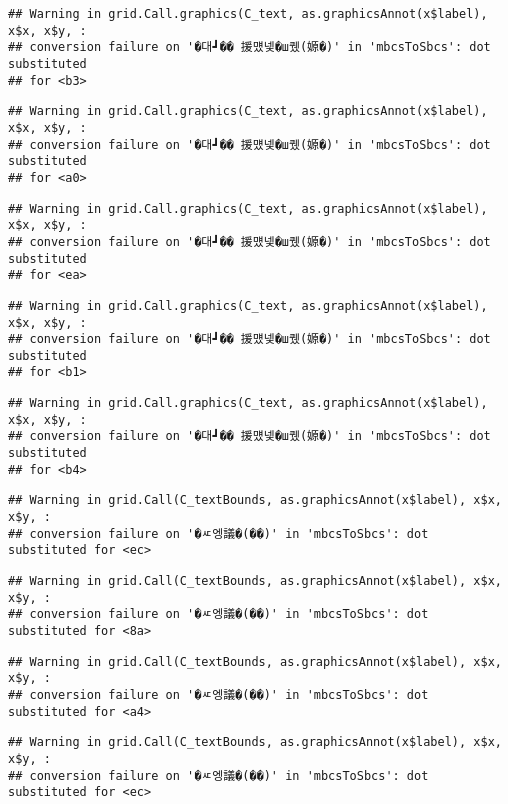 \documentclass[
]{article}
\begin{document}
\begin{verbatim}
## Warning in grid.Call.graphics(C_text, as.graphicsAnnot(x$label), x$x, x$y, :
## conversion failure on '�대┛�� 援먰넻�ш퀬(嫄�)' in 'mbcsToSbcs': dot substituted
## for <b3>
\end{verbatim}

\begin{verbatim}
## Warning in grid.Call.graphics(C_text, as.graphicsAnnot(x$label), x$x, x$y, :
## conversion failure on '�대┛�� 援먰넻�ш퀬(嫄�)' in 'mbcsToSbcs': dot substituted
## for <a0>
\end{verbatim}

\begin{verbatim}
## Warning in grid.Call.graphics(C_text, as.graphicsAnnot(x$label), x$x, x$y, :
## conversion failure on '�대┛�� 援먰넻�ш퀬(嫄�)' in 'mbcsToSbcs': dot substituted
## for <ea>
\end{verbatim}

\begin{verbatim}
## Warning in grid.Call.graphics(C_text, as.graphicsAnnot(x$label), x$x, x$y, :
## conversion failure on '�대┛�� 援먰넻�ш퀬(嫄�)' in 'mbcsToSbcs': dot substituted
## for <b1>
\end{verbatim}

\begin{verbatim}
## Warning in grid.Call.graphics(C_text, as.graphicsAnnot(x$label), x$x, x$y, :
## conversion failure on '�대┛�� 援먰넻�ш퀬(嫄�)' in 'mbcsToSbcs': dot substituted
## for <b4>
\end{verbatim}

\begin{verbatim}
## Warning in grid.Call(C_textBounds, as.graphicsAnnot(x$label), x$x, x$y, :
## conversion failure on '�ㅼ엥議�(��)' in 'mbcsToSbcs': dot substituted for <ec>
\end{verbatim}

\begin{verbatim}
## Warning in grid.Call(C_textBounds, as.graphicsAnnot(x$label), x$x, x$y, :
## conversion failure on '�ㅼ엥議�(��)' in 'mbcsToSbcs': dot substituted for <8a>
\end{verbatim}

\begin{verbatim}
## Warning in grid.Call(C_textBounds, as.graphicsAnnot(x$label), x$x, x$y, :
## conversion failure on '�ㅼ엥議�(��)' in 'mbcsToSbcs': dot substituted for <a4>
\end{verbatim}

\begin{verbatim}
## Warning in grid.Call(C_textBounds, as.graphicsAnnot(x$label), x$x, x$y, :
## conversion failure on '�ㅼ엥議�(��)' in 'mbcsToSbcs': dot substituted for <ec>
\end{verbatim}
\end{document}
